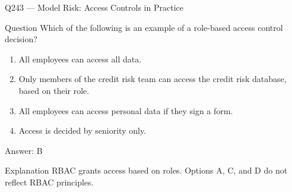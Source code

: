 \documentclass[aspectratio=169,8pt]{beamer}
\begin{document}
																																																		\begin{frame}{Q243 --- Model Risk: Access Controls in Practice}
																																																			\begin{block}{Question}
																																																				Which of the following is an example of a role-based access control decision?
																																																				\begin{enumerate}
																																																					\item All employees can access all data.
																																																					\item Only members of the credit risk team can access the credit risk database, based on their role.
																																																					\item All employees can access personal data if they sign a form.
																																																					\item Access is decided by seniority only.
																																																				\end{enumerate}  \end{block}
																																																				\begin{exampleblock}{Answer: B}\end{exampleblock}
																																																				\begin{block}{Explanation}
																																																					RBAC grants access based on roles. Options A, C, and D do not reflect RBAC principles.
																																																				\end{block}
																																																			\end{frame}
																																																			
\end{document}
